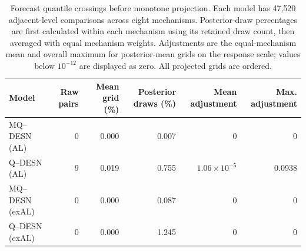 \begin{table}[!htbp]
\centering
\footnotesize
\setlength{\tabcolsep}{3pt}
\renewcommand{\arraystretch}{1.08}
\begin{tabular}{@{}lrrrrr@{}}
\toprule
Model & Raw pairs & Mean grid (\%) & Posterior draws (\%) & Mean adjustment & Max. adjustment \\
\midrule
MQ--DESN (AL) & 0 & 0.000 & 0.007 & 0 & 0 \\
Q--DESN (AL) & 9 & 0.019 & 0.755 & \(1.06\times10^{-5}\) & 0.0938 \\
MQ--DESN (exAL) & 0 & 0.000 & 0.087 & 0 & 0 \\
Q--DESN (exAL) & 0 & 0.000 & 1.245 & 0 & 0 \\
\bottomrule
\end{tabular}
\caption{Forecast quantile crossings before monotone projection. Each model has 47,520 adjacent-level comparisons across eight mechanisms. Posterior-draw percentages are first calculated within each mechanism using its retained draw count, then averaged with equal mechanism weights. Adjustments are the equal-mechanism mean and overall maximum for posterior-mean grids on the response scale; values below \(10^{-12}\) are displayed as zero. All projected grids are ordered.}
\label{tab:joint-qdesn-pure-desn-v2-crossings}
\end{table}
